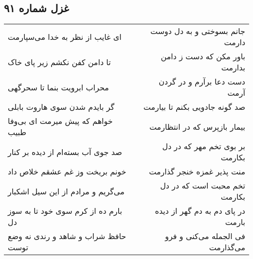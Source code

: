 \begin{center}
\section*{غزل شماره ۹۱}
\label{sec:sh091}
\begin{longtable}{l p{0.5cm} r}
ای غایب از نظر به خدا می‌سپارمت
&&
جانم بسوختی و به دل دوست دارمت
\\
تا دامن کفن نکشم زیر پای خاک
&&
باور مکن که دست ز دامن بدارمت
\\
محراب ابرویت بنما تا سحرگهی
&&
دست دعا برآرم و در گردن آرمت
\\
گر بایدم شدن سوی هاروت بابلی
&&
صد گونه جادویی بکنم تا بیارمت
\\
خواهم که پیش میرمت ای بی‌وفا طبیب
&&
بیمار بازپرس که در انتظارمت
\\
صد جوی آب بسته‌ام از دیده بر کنار
&&
بر بوی تخم مهر که در دل بکارمت
\\
خونم بریخت وز غم عشقم خلاص داد
&&
منت پذیر غمزه خنجر گذارمت
\\
می‌گریم و مرادم از این سیل اشکبار
&&
تخم محبت است که در دل بکارمت
\\
بارم ده از کرم سوی خود تا به سوز دل
&&
در پای دم به دم گهر از دیده بارمت
\\
حافظ شراب و شاهد و رندی نه وضع توست
&&
فی الجمله می‌کنی و فرو می‌گذارمت
\\
\end{longtable}
\end{center}
